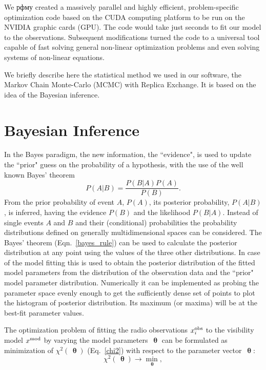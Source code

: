 \documentclass[preprint2]{aastex}
\newcommand{\bfth}{\,\bm{\uptheta}}
\begin{document}
We рфму created a massively parallel and highly efficient, problem-specific optimization code based on the CUDA computing platform to be run on the NVIDIA graphic cards (GPU). The code would take just seconds to fit our model to the observations. Subsequent modifications turned the code to a universal tool capable of fast solving general non-linear optimization problems and even solving systems of non-linear equations. 

We briefly describe here the statistical method we used in our software, the Markov Chain Monte-Carlo (MCMC) with Replica Exchange. It is based on the idea of the Bayesian inference. 



\section{Bayesian Inference}\label{bayesian}

In the Bayes paradigm, the new information, the ``evidence", is used to update the ``prior" guess on the probability of a hypothesis, with the use of the well known Bayes' theorem
\begin{equation}
  \label{bayes_rule}
  P(A|B) =  \frac{P(B|A)P(A)}{P(B)}.
\end{equation}
From the prior probability of event $A$, $P(A)$, its posterior probability, $P(A|B)$, is inferred, having the evidence $P(B)$ and the likelihood $P(B|A)$. Instead of single events $A$ and $B$ and their (conditional) probabilities the probability distributions defined on generally multidimensional spaces can be considered. The Bayes' theorem (Eqn.~\eqref{bayes_rule}) can be used to calculate the posterior distribution at any point using the values of the three other distributions. In case of the model fitting this is used to obtain the posterior distribution of the fitted model parameters from the distribution of the observation data and the ``prior" model parameter distribution. Numerically it can be implemented as  probing the parameter space evenly enough to get the sufficiently dense set of points to plot the histogram of posterior distribution. Its maximum (or maxima) will be at the best-fit parameter values.

The optimization problem of fitting the radio observations $x_i^{\rm obs}$ to the visibility model $x^{\rm mod}$ by varying the model parameters $\bfth$ can be formulated as minimization of $\chi^2(\bfth)$ (Eq.~\eqref{chi2}) with respect to the parameter vector $\bfth$:
\begin{equation*}
  \label{chi2_nonumber}
  \chi^2(\bfth) \rightarrow {\min\limits_{\bfth}},
\end{equation*}
\end{document}
